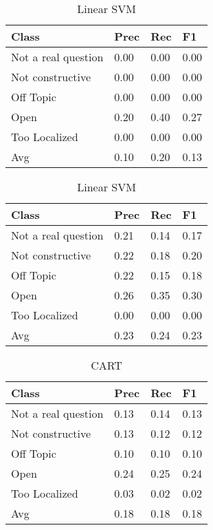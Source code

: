 \begin{table}[!htpb]
\centering
\begin{minipage}{.5\linewidth}
    \begin{tabular}{|l|l|l|l|} \hline
    \textbf{Class}& \textbf{Prec} & \textbf{Rec} & \textbf{F1} \\ \hline
    Not a real question & 0.00      & 0.00   & 0.00     \\
    Not constructive    & 0.00      & 0.00   & 0.00     \\
    Off Topic           & 0.00      & 0.00   & 0.00     \\
    Open                & 0.20      & 0.40   & 0.27     \\
    Too Localized       & 0.00      & 0.00   & 0.00     \\ \hline
    Avg                 & 0.10      & 0.20   & 0.13   \\ \hline   
    \end{tabular}
    \caption{Radial SVM}
    \label{tab1:rsvm}
\end{minipage}%
\begin{minipage}{.5\linewidth}
    \begin{tabular}{|l|l|l|l|} \hline
    \textbf{Class}& \textbf{Prec} & \textbf{Rec} & \textbf{F1} \\ \hline
    Not a real question & 0.21      & 0.14   & 0.17     \\
    Not constructive    & 0.22      & 0.18   & 0.20     \\
    Off Topic           & 0.22      & 0.15   & 0.18     \\
    Open                & 0.26      & 0.35   & 0.30     \\
    Too Localized       & 0.00      & 0.00   & 0.00     \\ \hline
    Avg                 & 0.23      & 0.24   & 0.23   \\ \hline  
    \end{tabular}
    \caption{Linear SVM}
    \label{tab1:lsvm}
\end{minipage}

\end{table}

\begin{table}[!htpb]
\centering
\begin{tabular}{|l|l|l|l|} \hline
\textbf{Class}& \textbf{Prec} & \textbf{Rec} & \textbf{F1} \\ \hline
Not a real question & 0.13      & 0.14   & 0.13     \\
Not constructive    & 0.13      & 0.12   & 0.12     \\
Off Topic           & 0.10      & 0.10   & 0.10     \\
Open                & 0.24      & 0.25   & 0.24     \\
Too Localized       & 0.03      & 0.02   & 0.02     \\ \hline
Avg                 & 0.18      & 0.18   & 0.18   \\ \hline  
\end{tabular}
\caption{CART}
\label{tab1:cart}
\end{table}


